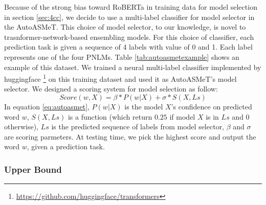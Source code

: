 \documentclass[11pt]{article}
\begin{document}
Because of the strong bias toward RoBERTa in training data for model selection in section \ref{sec:4cc}, we decide to use a multi-label classifier for model selector in the AutoASMeT. This choice of model selector, to our knowledge, is novel to trasnformer-network-based ensembling models. For this choice of classifier, each prediction task is given a sequence of 4 labels with value of 0 and 1. Each label represents one of the four PNLMs. Table \ref{tab:autoasmetexample} shows an example of this dataset. We trained a neural multi-label classifier implemented by huggingface \footnote{\url{https://github.com/huggingface/transformers}} on this training dataset and used it as AutoASMeT's model selector. We designed a scoring system for model selection as follow:
\begin{equation} \label{eq:autoasmet}
	Score(w, X) = \beta * P(w|X) + \sigma * S(X, Ls)
\end{equation}
In equation \ref{eq:autoasmet}, $P(w|X)$ is the model $X$'s confidence on predicted word $w$, $S(X, Ls)$ is a function (which return $0.25$ if model $X$ is in $Ls$ and $0$ otherwise), $Ls$ is the predicted sequence of labels from model selector, $\beta$ and $\sigma$ are scoring parmeters.  
At testing time, we pick the highest score and output the word $w$, given a prediction task.

\begin{table}
    \centering
    \caption{An example of tranining data for the AutoASMeT model. For a prediction task, a sequence of 4 labels is give in the order "RoBERTa BERT XLNet GPT-2". The value of 1 means the model correctly predict the right word, and 0 otherwise.}
    \label{tab:autoasmetexample}
\end{table}

\subsubsection{Upper Bound}
\end{document}
